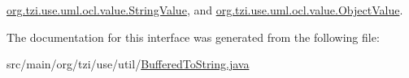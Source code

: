 \hyperlink{classorg_1_1tzi_1_1use_1_1uml_1_1ocl_1_1value_1_1_string_value_ad72b6701bf1d7257e7ca5834f929ef95}{org.\-tzi.\-use.\-uml.\-ocl.\-value.\-String\-Value}, and \hyperlink{classorg_1_1tzi_1_1use_1_1uml_1_1ocl_1_1value_1_1_object_value_a4e5ebf70eaade909de42f873eb9f6a84}{org.\-tzi.\-use.\-uml.\-ocl.\-value.\-Object\-Value}.



The documentation for this interface was generated from the following file\-:\begin{DoxyCompactItemize}
\item 
src/main/org/tzi/use/util/\hyperlink{_buffered_to_string_8java}{Buffered\-To\-String.\-java}\end{DoxyCompactItemize}
